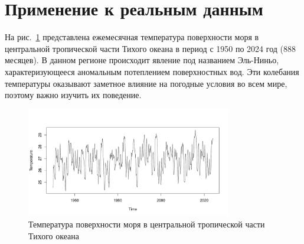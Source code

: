 \documentclass[specialist,
substylefile = spbu_report.rtx,
subf,href,colorlinks=true, 12pt]{disser}
\theoremstyle{definition}
\begin{document}


\section{Применение к реальным данным}\label{sect:examples}
На рис.~\ref{Nino_ts} представлена ежемесячная температура поверхности моря в центральной тропической части Тихого океана в период с 1950 по 2024 год ($888$ месяцев). В данном регионе происходит явление под названием Эль-Ниньо, характеризующееся аномальным потеплением поверхностных вод. Эти колебания температуры оказывают заметное влияние на погодные условия во всем мире, поэтому важно изучить их поведение.
\begin{figure}[h!]
	\centering
	\includegraphics[width=0.8\textwidth]{img/Nino_ts.pdf}
	\caption{Температура поверхности моря в центральной тропической части Тихого океана}
	\label{Nino_ts}	
\end{figure}
\end{document}
